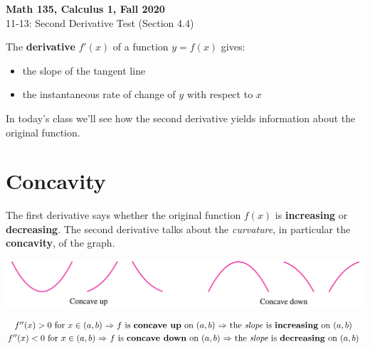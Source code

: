 \documentclass[11pt,reqno,final]{amsart}
\numberwithin{figure}{section}
\theoremstyle{definition} %
\begin{document}
\begin{center}
        \textbf{\Large Math 135, Calculus 1, Fall 2020}\\[10pt]
        {\large 11-13: Second Derivative Test (Section 4.4)}
\end{center}

\thispagestyle{empty}


\renewcommand{\thesection}{\Alph{section}}


The \textbf{derivative} $f'(x)$ of a function $y=f(x)$ gives:
\begin{itemize}
\item the slope of the tangent line
\item the instantaneous rate of change of $y$ with respect to $x$
\end{itemize}

In today's class we'll see how the second derivative yields information about the original function.

\section{Concavity}

The first derivative says whether the original function $f(x)$ is \textbf{increasing} or \textbf{decreasing}.
The second derivative talks about the \textit{curvature}, in particular the \textbf{concavity}, of the graph.
\begin{center}
        \includegraphics[width=\textwidth]{11-16P_concave}
\end{center}
\begin{framed}
        \begin{gather*}
                \mbox{$f''(x) > 0$ for $x \in (a,b)$
                  $\Rightarrow$
                  $f$ is \textbf{concave up} on $(a,b)$
                  $\Rightarrow$
                  the \textit{slope} is \textbf{increasing} on $(a,b)$
                }\\
                \mbox{$f''(x) < 0$ for $x \in (a,b)$
                  $\Rightarrow$
                  $f$ is \textbf{concave down} on $(a,b)$
                  $\Rightarrow$
                  the \textit{slope} is \textbf{decreasing} on $(a,b)$
                }
        \end{gather*}
\end{framed}
\end{document}
